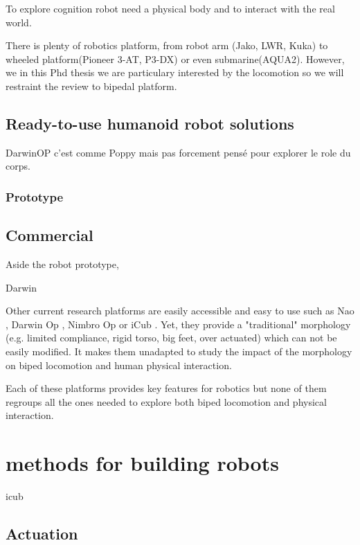 To explore cognition robot need a physical body and to interact with the real world.


There is plenty of robotics platform, from robot arm (Jako, LWR, Kuka) to wheeled platform(Pioneer 3-AT, P3-DX) or even submarine(AQUA2). However, we in this Phd thesis we are particulary interested by the locomotion so we will restraint the review to bipedal platform.

\subsection{Ready-to-use humanoid robot solutions} %


DarwinOP c'est comme Poppy mais pas forcement pensé pour explorer le role du corps.

\subsubsection{Prototype} %

\subsection{Commercial} %

Aside the robot prototype,

Darwin \cite{ha2011development}

Other current research platforms are easily accessible and easy to use such as Nao \cite{gouaillier2008nao}, Darwin Op \cite{ha2011development}, Nimbro Op \cite{schwarznimbro} or iCub \cite{metta2008icub}.
Yet, they provide a "traditional" morphology (e.g.
limited compliance, rigid torso, big feet, over actuated) which can not be easily modified.
It makes them unadapted to study the impact of the morphology on biped locomotion and human physical interaction.

Each of these platforms provides key features for robotics but none of them regroups all the ones needed to explore both biped locomotion and physical interaction.

\section{methods for building robots} %
icub~\cite{tsagarakis2007icub}

\subsection{Actuation} %


